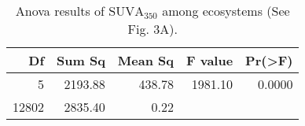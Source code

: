 \begin{table}[ht]
\centering
\begin{tabular}{rrrrr}
  \hline
Df & Sum Sq & Mean Sq & F value & Pr(>F) \\ 
  \hline
5 & 2193.88 & 438.78 & 1981.10 & 0.0000 \\ 
  12802 & 2835.40 & 0.22 &  &  \\ 
   \hline
\end{tabular}
\caption{Anova results of $\text{SUVA}_{350}$ among ecosystems (See Fig. 3A).} 
\end{table}
